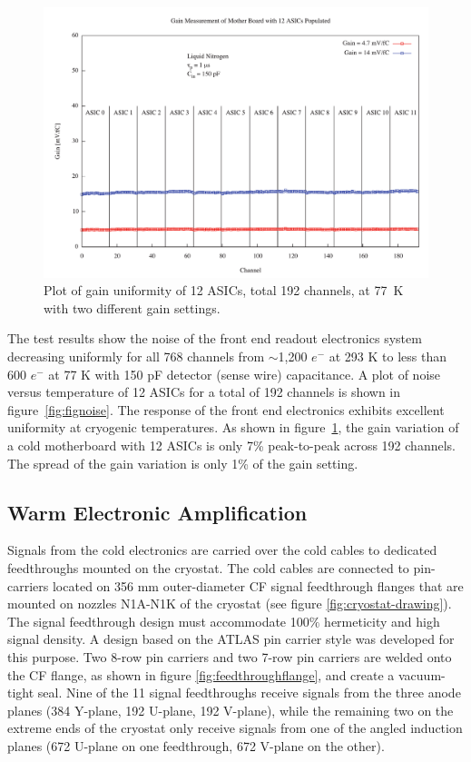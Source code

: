 \begin{figure}
\begin{center}
\includegraphics[scale=0.4]{figures/gain.pdf}
\end{center}
\caption{\label{fig:figgain}Plot of gain uniformity of 12 ASICs, total 192 channels, at 77~K with two different gain settings.}
\end{figure}

The test results show the noise of the front end readout electronics system decreasing uniformly for all 768 channels from $\sim$1,200 $e^{-}$ at 293 K to less than 600 $e^{-}$ at 77 K with 150 pF detector (sense wire) capacitance. A plot of noise versus temperature of 12 ASICs for a total of 192 channels is shown in figure~\ref{fig:fignoise}. The response of the front end electronics exhibits excellent uniformity at cryogenic temperatures. As shown in figure~\ref{fig:figgain}, the gain variation of a cold motherboard with 12 ASICs is only 7\% peak-to-peak across 192 channels. The spread of the gain variation is only 1\% of the gain setting.

\subsection{Warm Electronic Amplification}
\label{sec:warmelectronics}
Signals from the cold electronics are carried over the cold cables to dedicated feedthroughs mounted on the cryostat.  The cold cables are connected to pin-carriers located on 356 mm outer-diameter CF signal feedthrough flanges that are mounted on nozzles N1A-N1K of the cryostat (see figure \ref{fig:cryostat-drawing}).  The signal feedthrough design must accommodate 100$\%$ hermeticity and high signal density. A design based on the ATLAS pin carrier style was developed for this purpose.  Two 8-row pin carriers and two 7-row pin carriers are welded onto the CF flange, as shown in figure \ref{fig:feedthroughflange}, and create a vacuum-tight seal.  Nine of the 11 signal feedthroughs receive signals from the three \lartpc anode planes (384 Y-plane, 192 U-plane, 192 V-plane), while the remaining two on the extreme ends of the cryostat only receive signals from one of the angled induction planes (672 U-plane on one feedthrough, 672 V-plane on the other).


